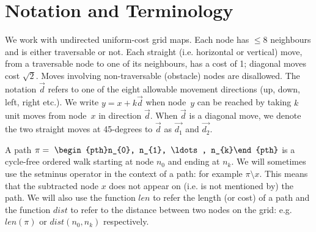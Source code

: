 \section{Notation and Terminology}
\label{sec:notation}
We work with undirected uniform-cost grid maps.  Each node has $\leq 8$
neighbours and is either traversable or not.  Each straight (i.e. horizontal or
vertical) move, from a traversable node to one of its neighbours, has a cost of
1; diagonal moves cost $\sqrt 2$.  Moves involving non-traversable
(obstacle) nodes are disallowed.  The notation $\vec{d}$ refers to one of the
eight allowable movement directions (up, down, left, right etc.).  We write $y =
x + k\vec{d}$ when node~$y$ can be reached by taking $k$ unit moves from
node~$x$ in direction $\vec{d}$.  When $\vec{d}$ is a diagonal move, we denote
the two straight moves at 45-degrees to $\vec{d}$ as $\vec{d_1}$ and $\vec{d_2}$.

A path $\pi =~\begin{pth}n_{0}, n_{1}, \ldots , n_{k}\end{pth}$ is a cycle-free
ordered walk starting at node $n_{0}$ and ending at $n_{k}$.  We will sometimes
use the setminus operator in the context of a path: for example $\pi \setminus
x$. This means that the subtracted node $x$ does not appear on (i.e. is not
mentioned by) the path.  We will also use the function $len$ to refer the length
(or cost) of a path and the function $dist$ to refer to the distance between two
nodes on the grid: e.g. $len(\pi)$ or $dist(n_{0}, n_{k})$ respectively.  



